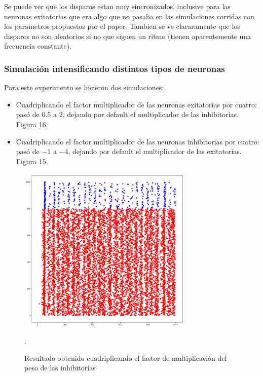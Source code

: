 \documentclass[12pt]{article}
\begin{document}
\newpage

Se puede ver que los disparos estan muy sincronizados, inclusive para las neuronas exitatorias que era algo que no pasaba en las simulaciones corridas con los parametros propuestos por el paper.
Tambien se ve clararamente que los disparos no son aleatorios si no que siguen un ritmo (tienen aparentemente una frecuencia constante).

\subsubsection{Simulación intensificando distintos tipos de neuronas}
Para este experimento se hicieron dos simulaciones:
\begin{itemize}
    \item Cuadriplicando el factor multiplicador de las neuronas exitatorias por cuatro: pasó de $0.5$ a $2$, dejando por default el multiplicador de las inhibitorias. Figura 16.
    \item Cuadriplicando el factor multiplicador de las neuronas inhibitorias por cuatro: pasó de $-1$ a $-4$, dejando por default el multiplicador de las exitatorias. Figura 15.
\end{itemize}

\begin{figure}[htp!]
    \centering
        \includegraphics[height=8cm]{images/resultadoCuadrupleInhibitoria.png}
    \caption[fontsize=2pt]{Resultado obtenido cuadriplicando el factor de multiplicación del peso de las inhibitorias}.
\end{figure}
\end{document}
